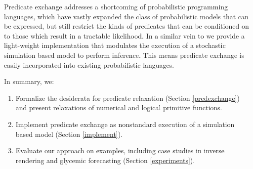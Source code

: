 


Predicate exchange addresses a shortcoming of probabilistic programming languages,
which have vastly expanded the class of probabilistic models that can be expressed, but still restrict the kinds of predicates that can be conditioned on to those which result in a tractable likelihood.
In a similar vein to  \cite{wingate2011lightweight} we provide a light-weight implementation that modulates the execution of a stochastic simulation based model to perform inference.
This means predicate exchange is easily incorporated into existing probabilistic languages. 


In summary, we:

\begin{enumerate}
	\item Formalize the desiderata for predicate relaxation (Section \ref{predexchange}) and present relaxations of numerical and logical primitive functions.
	\item Implement predicate exchange as nonstandard execution of a simulation based model (Section \ref{implement}).
	\item Evaluate our approach on examples, including case studies in inverse rendering and glycemic forecasting (Section \ref{experiments}).
\end{enumerate}



